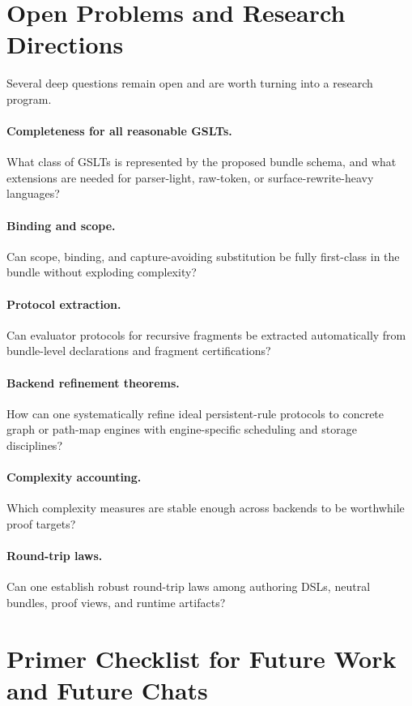 \documentclass[11pt]{article}
\begin{document}
\section{Open Problems and Research Directions}

Several deep questions remain open and are worth turning into a research program.

\paragraph{Completeness for all reasonable GSLTs.}
What class of GSLTs is represented by the proposed bundle schema, and what extensions are needed for parser-light, raw-token, or surface-rewrite-heavy languages?

\paragraph{Binding and scope.}
Can scope, binding, and capture-avoiding substitution be fully first-class in the bundle without exploding complexity?

\paragraph{Protocol extraction.}
Can evaluator protocols for recursive fragments be extracted automatically from bundle-level declarations and fragment certifications?

\paragraph{Backend refinement theorems.}
How can one systematically refine ideal persistent-rule protocols to concrete graph or path-map engines with engine-specific scheduling and storage disciplines?

\paragraph{Complexity accounting.}
Which complexity measures are stable enough across backends to be worthwhile proof targets?

\paragraph{Round-trip laws.}
Can one establish robust round-trip laws among authoring DSLs, neutral bundles, proof views, and runtime artifacts?

\section{Primer Checklist for Future Work and Future Chats}
\end{document}
